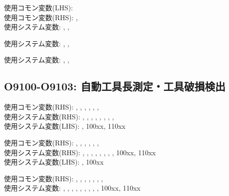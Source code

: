 \begin{hosoku}\small
使用コモン変数(LHS): \\
使用コモン変数(RHS): , \\
使用システム変数: , , 
\end{hosoku}

\begin{hosoku}\small
使用システム変数: , , 
\end{hosoku}

\begin{hosoku}\small
使用システム変数: , , 
\end{hosoku}

\subsection{O9100-O9103: 自動工具長測定・工具破損検出}
\begin{hosoku}\small
使用コモン変数(RHS): , , , , , , \\
使用システム変数(RHS): , , , , , , , , \\
使用システム変数(LHS): , \ttNum100xx, \ttNum110xx
\end{hosoku}

\begin{hosoku}\small
使用コモン変数(RHS): , , , , , , \\
使用システム変数(RHS): , , , , , , , , \ttNum100xx, \ttNum110xx\\
使用システム変数(LHS): , \ttNum100xx
\end{hosoku}

\begin{hosoku}\small
使用コモン変数(RHS): , , , , , , , \\
使用システム変数: , , , , , , , , , \ttNum100xx, \ttNum110xx
\end{hosoku}

